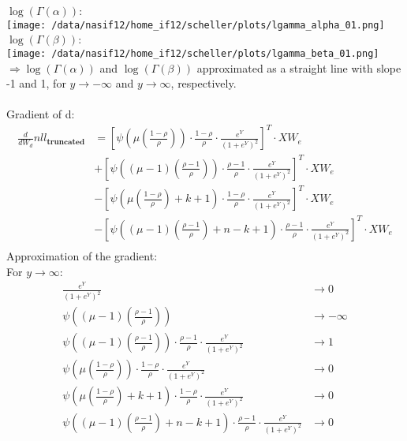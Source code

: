 \documentclass[12pt,a4paper, fleqn]{article}
\begin{document}
$\log(\Gamma(\alpha))$:\\
\texttt{[image: /data/nasif12/home\_if12/scheller/plots/lgamma\_alpha\_01.png]} \\
\newpage
$\log(\Gamma(\beta))$:\\
\texttt{[image: /data/nasif12/home\_if12/scheller/plots/lgamma\_beta\_01.png]} \\
$\Rightarrow \log(\Gamma(\alpha))$ and $\log(\Gamma(\beta))$ approximated as a straight line with slope -1 and 1, for $y \rightarrow -\infty$ and $y \rightarrow \infty$, respectively.\\
\ \\
Gradient of d:
\begin{align*}
\frac{d}{d W_{d}} nll_{\textbf{truncated}} &= \left[ \psi\left(\mu\left(\frac{1-\rho}{\rho}\right) \right) \cdot \frac{1-\rho}{\rho} \cdot \frac{e^{Y}}{\left(1+e^{Y}\right)^2} \right]^T \cdot XW_e \\
&+ \left[ \psi\left(\left(\mu - 1\right)\left(\frac{\rho - 1}{\rho}\right) \right) \cdot \frac{\rho - 1}{\rho} \cdot \frac{e^{Y}}{\left(1+e^{Y}\right)^2} \right]^T \cdot XW_e \\
&- \left[ \psi\left(\mu\left(\frac{1-\rho}{\rho}\right)  + k + 1 \right) \cdot \frac{1-\rho}{\rho} \cdot \frac{e^{Y}}{\left(1+e^{Y}\right)^2} \right]^T \cdot XW_e \\
&- \left[ \psi\left(\left(\mu - 1\right)\left(\frac{\rho - 1}{\rho}\right) + n - k + 1 \right) \cdot \frac{\rho - 1}{\rho} \cdot \frac{e^{Y}}{\left(1+e^{Y}\right)^2} \right]^T \cdot XW_e \\
\end{align*}
Approximation of the gradient:\\
For $y \rightarrow \infty$:
\begin{align*}
\frac{e^{Y}}{\left(1+e^{Y}\right)^2} &\rightarrow 0 \\
\psi\left(\left(\mu - 1\right)\left(\frac{\rho - 1}{\rho}\right) \right) &\rightarrow -\infty \\
\psi\left(\left(\mu - 1\right)\left(\frac{\rho - 1}{\rho}\right) \right) \cdot \frac{\rho - 1}{\rho} \cdot \frac{e^{Y}}{\left(1+e^{Y}\right)^2}  &\rightarrow 1 \\
\psi\left(\mu\left(\frac{1-\rho}{\rho}\right) \right) \cdot \frac{1-\rho}{\rho} \cdot \frac{e^{Y}}{\left(1+e^{Y}\right)^2}  &\rightarrow 0 \\
\psi\left(\mu\left(\frac{1-\rho}{\rho}\right)  + k + 1 \right) \cdot \frac{1-\rho}{\rho} \cdot \frac{e^{Y}}{\left(1+e^{Y}\right)^2}  &\rightarrow 0 \\
\psi\left(\left(\mu - 1\right)\left(\frac{\rho - 1}{\rho}\right) + n - k + 1 \right) \cdot \frac{\rho - 1}{\rho} \cdot \frac{e^{Y}}{\left(1+e^{Y}\right)^2}  &\rightarrow 0 \\
\end{align*}
\end{document}
